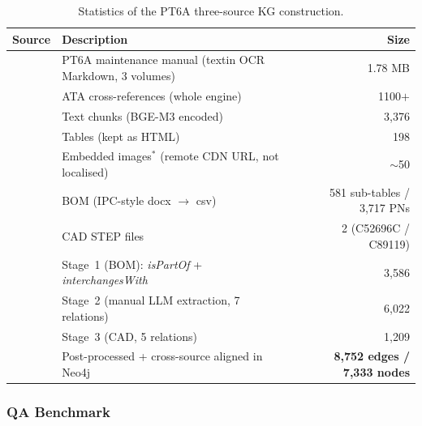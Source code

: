 \documentclass[applsci,article,submit,pdftex,moreauthors]{Definitions/mdpi}
\begin{document}
\begin{table}[H]
\caption{Statistics of the PT6A three-source KG construction.\label{tab:dataset-stats}}
\begin{tabularx}{\textwidth}{p{2.5cm}p{6.4cm}r}
\toprule
\textbf{Source} & \textbf{Description} & \textbf{Size}\\
\midrule
{}
 & PT6A maintenance manual (textin OCR Markdown, 3 volumes)  & 1.78 MB\\
 & ATA cross-references (whole engine)                       & 1100$+$\\
 & Text chunks (BGE-M3 encoded)                              & 3{,}376\\
 & Tables (kept as HTML)                                     & 198\\
 & Embedded images$^{*}$ (remote CDN URL, not localised)     & $\sim$50\\
\midrule
{}
 & BOM (IPC-style docx $\rightarrow$ csv)                    & 581 sub-tables / 3{,}717 PNs\\
 & CAD STEP files                                            & 2 (C52696C / C89119)\\
\midrule
{}
 & Stage~1 (BOM): \emph{isPartOf} + \emph{interchangesWith}  & 3{,}586\\
 & Stage~2 (manual LLM extraction, 7 relations)              & 6{,}022\\
 & Stage~3 (CAD, 5 relations)                                & 1{,}209\\
 & Post-processed + cross-source aligned in Neo4j            & \textbf{8{,}752 edges / 7{,}333 nodes}\\
\bottomrule
\end{tabularx}
\end{table}

\subsubsection{QA Benchmark}
\end{document}
